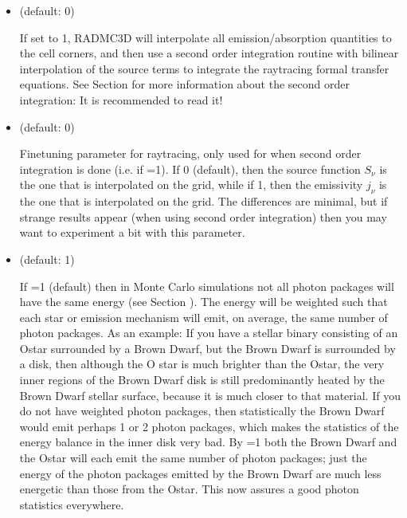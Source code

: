 \documentclass[letterpaper,10pt,english]{sphinxmanual}
\begin{document}
\begin{itemize}
\item {} 
 (default: 0)

If set to 1, RADMC\sphinxhyphen{}3D will interpolate all emission/absorption quantities
to the cell corners, and then use a second order integration routine with
bilinear interpolation of the source terms to integrate the ray\sphinxhyphen{}tracing
formal transfer equations. See Section {\hyperref[\detokenize{imagesspectra:sec-second-order}]{}} for more
information about the second order integration: It is recommended to
read it!

\item {} 
 (default: 0) 

Fine\sphinxhyphen{}tuning parameter for ray\sphinxhyphen{}tracing, only used for when second order
integration is done (i.e. if =1). If 0
(default), then the source function \(S_\nu\) is the one that is
interpolated on the grid, while if 1, then the emissivity \(j_\nu\) is the
one that is interpolated on the grid. The differences are minimal, but
if strange results appear (when using second order integration) then you
may want to experiment a bit with this parameter.

\item {} 
 (default: 1) 

If =1 (default) then in Monte Carlo simulations not
all photon packages will have the same energy (see Section
{\hyperref[\detokenize{dustradtrans:sec-photon-packages-mc}]{}}). The energy will be weighted such that each
star or emission mechanism will emit, on average, the same number of photon
packages. As an example: If you have a stellar binary consisting of an O\sphinxhyphen{}star
surrounded by a Brown Dwarf, but the Brown Dwarf is surrounded by a disk, then
although the O star is much brighter than the O\sphinxhyphen{}star, the very inner regions
of the Brown Dwarf disk is still predominantly heated by the Brown Dwarf
stellar surface, because it is much closer to that material. If you do not
have weighted photon packages, then statistically the Brown Dwarf would emit
perhaps 1 or 2 photon packages, which makes the statistics of the energy
balance in the inner disk very bad. By =1 both the
Brown Dwarf and the O\sphinxhyphen{}star will each emit the same number of photon packages;
just the energy of the photon packages emitted by the Brown Dwarf are much
less energetic than those from the O\sphinxhyphen{}star.  This now assures a good photon
statistics everywhere.


\end{itemize}
\end{document}
